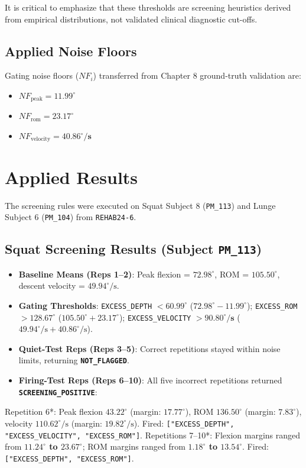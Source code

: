 It is critical to emphasize that these thresholds are screening heuristics derived from empirical distributions, not validated clinical diagnostic cut-offs.

\subsection{Applied Noise Floors}
\label{sec:10-4-2-applied-noise-floors}

Gating noise floors ($NF_i$) transferred from Chapter 8 ground-truth validation are:
\begin{itemize}
  \item $NF_{\text{peak}} = \mathbf{11.99^\circ}$
  \item $NF_{\text{rom}} = \mathbf{23.17^\circ}$
  \item $NF_{\text{velocity}} = \mathbf{40.86^\circ/\text{s}}$
\end{itemize}



\section{Applied Results}
\label{sec:10-5-applied-results}


The screening rules were executed on Squat Subject 8 (\texttt{PM\_113}) and Lunge Subject 6 (\texttt{PM\_104}) from \texttt{REHAB24-6}.

\subsection{Squat Screening Results (Subject \texttt{PM\_113})}
\label{sec:10-5-1-squat-screening-results-subject-texttt-pm-113}

\begin{itemize}
  \item \textbf{Baseline Means (Reps 1–2)}: Peak flexion = \textbf{$72.98^\circ$}, ROM = \textbf{$105.50^\circ$}, descent velocity = \textbf{$49.94^\circ/\text{s}$}.
  \item \textbf{Gating Thresholds}: \texttt{EXCESS\_DEPTH} $< \mathbf{60.99^\circ}$ ($72.98^\circ - 11.99^\circ$); \texttt{EXCESS\_ROM} $> \mathbf{128.67^\circ}$ ($105.50^\circ + 23.17^\circ$); \texttt{EXCESS\_VELOCITY} $> \mathbf{90.80^\circ/\text{s}}$ ($49.94^\circ/\text{s} + 40.86^\circ/\text{s}$).
  \item \textbf{Quiet-Test Reps (Reps 3–5)}: Correct repetitions stayed within noise limits, returning \textbf{\texttt{NOT\_FLAGGED}}.
  \item \textbf{Firing-Test Reps (Reps 6–10)}: All five incorrect repetitions returned \textbf{\texttt{SCREENING\_POSITIVE}}:
\end{itemize}
\textit{   }Repetition 6*: Peak flexion $43.22^\circ$ (margin: \textbf{$17.77^\circ$}), ROM $136.50^\circ$ (margin: \textbf{$7.83^\circ$}), velocity $110.62^\circ/\text{s}$ (margin: \textbf{$19.82^\circ/\text{s}$}). Fired: \texttt{["EXCESS\_DEPTH", "EXCESS\_VELOCITY", "EXCESS\_ROM"]}.
\textit{   }Repetitions 7–10*: Flexion margins ranged from \textbf{$11.24^\circ$ to $23.67^\circ$}; ROM margins ranged from \textbf{$1.18^\circ$ to $13.54^\circ$}. Fired: \texttt{["EXCESS\_DEPTH", "EXCESS\_ROM"]}.

